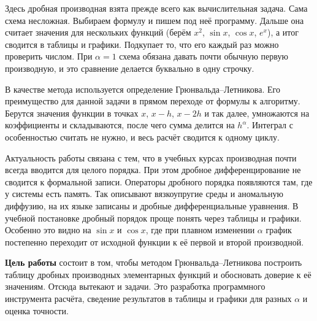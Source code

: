 \documentclass[14pt,a4paper]{extarticle}
\begin{document}
Здесь дробная производная взята прежде всего как вычислительная задача. Сама схема несложная. Выбираем формулу и пишем под неё программу. Дальше она считает значения для нескольких функций (берём $x^2$, $\sin x$, $\cos x$, $e^x$), а итог сводится в таблицы и графики. Подкупает то, что его каждый раз можно проверить числом. При $\alpha=1$ схема обязана давать почти обычную первую производную, и это сравнение делается буквально в одну строчку.

В качестве метода используется определение Грюнвальда--Летникова. Его преимущество для данной задачи в прямом переходе от формулы к алгоритму. Берутся значения функции в точках $x$, $x-h$, $x-2h$ и так далее, умножаются на коэффициенты и складываются, после чего сумма делится на $h^{\alpha}$. Интеграл с особенностью считать не нужно, и весь расчёт сводится к одному циклу.

Актуальность работы связана с тем, что в учебных курсах производная почти всегда вводится для целого порядка. При этом дробное дифференцирование не сводится к формальной записи. Операторы дробного порядка появляются там, где у системы есть память. Так описывают вязкоупругие среды и аномальную диффузию, на их языке записаны и дробные дифференциальные уравнения. В учебной постановке дробный порядок проще понять через таблицы и графики. Особенно это видно на $\sin x$ и $\cos x$, где при плавном изменении $\alpha$ график постепенно переходит от исходной функции к её первой и второй производной.

\textbf{Цель работы} состоит в том, чтобы методом Грюнвальда--Летникова построить таблицу дробных производных элементарных функций и обосновать доверие к её значениям. Отсюда вытекают и задачи. Это разработка программного инструмента расчёта, сведение результатов в таблицы и графики для разных $\alpha$ и оценка точности.
\end{document}
